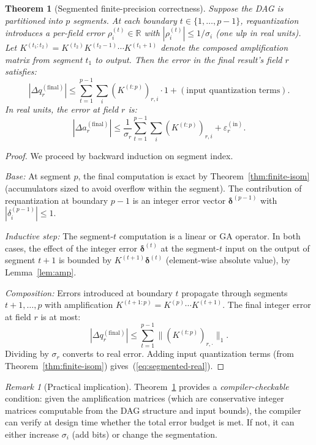 \documentclass[11pt,a4paper]{article}
\theoremstyle{definition}
\theoremstyle{plain}
\newtheorem{theorem}{Theorem}[section]
\theoremstyle{remark}
\newtheorem{remark}{Remark}[section]
\newcommand{\bv}[1]{\mathbf{#1}}
\begin{document}
\begin{theorem}[Segmented finite-precision correctness]
\label{thm:segmented}
Suppose the DAG is partitioned into $p$ segments.  At each boundary $t\in\{1,\ldots,p-1\}$, requantization introduces a per-field error $\rho_i^{(t)} \in \mathbb{R}$ with $|\rho_i^{(t)}|\le 1/\sigma_i$ (one ulp in real units).  Let $K^{(t_1:t_2)} = K^{(t_2)} K^{(t_2-1)} \cdots K^{(t_1+1)}$ denote the composed amplification matrix from segment $t_1$ to output.  Then the error in the final result's field $r$ satisfies:
\begin{equation}\label{eq:segmented-err}
  |\Delta q_r^{(\mathrm{final})}| \le \sum_{t=1}^{p-1} \sum_i (K^{(t:p)})_{r,i} \cdot 1 + (\text{input quantization terms}).
\end{equation}
In real units, the error at field $r$ is:
\begin{equation}\label{eq:segmented-real}
  |\Delta a_r^{(\mathrm{final})}| \le \frac{1}{\sigma_r}\sum_{t=1}^{p-1} \sum_i (K^{(t:p)})_{r,i} + \varepsilon_r^{(\mathrm{in})}.
\end{equation}
\end{theorem}

\begin{proof}
We proceed by backward induction on segment index.

\textit{Base:} At segment $p$, the final computation is exact by Theorem~\ref{thm:finite-isom} (accumulators sized to avoid overflow within the segment).  The contribution of requantization at boundary $p-1$ is an integer error vector $\bv{\delta}^{(p-1)}$ with $|\delta_i^{(p-1)}|\le 1$.

\textit{Inductive step:} The segment-$t$ computation is a linear or GA operator.  In both cases, the effect of the integer error $\bv{\delta}^{(t)}$ at the segment-$t$ input on the output of segment $t+1$ is bounded by $K^{(t+1)}\bv{\delta}^{(t)}$ (element-wise absolute value), by Lemma~\ref{lem:amp}.

\textit{Composition:} Errors introduced at boundary $t$ propagate through segments $t+1,\ldots,p$ with amplification $K^{(t+1:p)} = K^{(p)} \cdots K^{(t+1)}$.  The final integer error at field $r$ is at most:
\[
  |\Delta q_r^{(\mathrm{final})}| \le \sum_{t=1}^{p-1} \|(K^{(t:p)})_{r,\cdot}\|_1.
\]
Dividing by $\sigma_r$ converts to real error.  Adding input quantization terms (from Theorem~\ref{thm:finite-isom}) gives~(\ref{eq:segmented-real}).
\end{proof}

\begin{remark}[Practical implication]
Theorem~\ref{thm:segmented} provides a \emph{compiler-checkable} condition: given the amplification matrices (which are conservative integer matrices computable from the DAG structure and input bounds), the compiler can verify at design time whether the total error budget is met.  If not, it can either increase $\sigma_i$ (add bits) or change the segmentation.
\end{remark}
\end{document}
